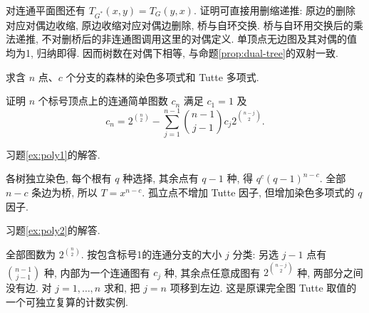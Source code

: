 对连通平面图还有 $T_{G^*}(x,y)=T_G(y,x)$. 证明可直接用删缩递推: 原边的删除对应对偶边收缩, 原边收缩对应对偶边删除, 桥与自环交换. 桥与自环用交换后的乘法递推, 不对删桥后的非连通图调用这里的对偶定义. 单顶点无边图及其对偶的值均为1, 归纳即得. 因而树数在对偶下相等, 与命题\ref{prop:dual-tree}的双射一致.
\begin{exercise}\label{ex:poly1}
求含 $n$ 点、$c$ 个分支的森林的染色多项式和 Tutte 多项式.
\end{exercise}
\begin{exercise}\label{ex:poly2}
证明 $n$ 个标号顶点上的连通简单图数 $c_n$ 满足 $c_1=1$ 及
\[
c_n=2^{\binom n2}-\sum_{j=1}^{n-1}\binom{n-1}{j-1}c_j2^{\binom{n-j}2}.
\]
\end{exercise}
习题\ref{ex:poly1}的解答.
\begin{solution}
各树独立染色, 每个根有 $q$ 种选择, 其余点有 $q-1$ 种, 得 $q^c(q-1)^{n-c}$. 全部 $n-c$ 条边为桥, 所以 $T=x^{n-c}$. 孤立点不增加 Tutte 因子, 但增加染色多项式的 $q$ 因子.
\end{solution}
习题\ref{ex:poly2}的解答.
\begin{solution}
全部图数为 $2^{\binom n2}$. 按包含标号1的连通分支的大小 $j$ 分类: 另选 $j-1$ 点有 $\binom{n-1}{j-1}$ 种, 内部为一个连通图有 $c_j$ 种, 其余点任意成图有 $2^{\binom{n-j}2}$ 种, 两部分之间没有边. 对 $j=1,\ldots,n$ 求和, 把 $j=n$ 项移到左边. 这是原课完全图 Tutte 取值的一个可独立复算的计数实例.
\end{solution}
